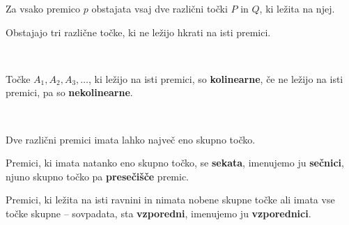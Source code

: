             \begin{aksiom}
                Za vsako premico $p$ obstajata vsaj dve različni točki $P$ in $Q$, ki ležita na njej.
            \end{aksiom}

            \begin{aksiom}
                Obstajajo tri različne točke, ki ne ležijo hkrati na isti premici.
            \end{aksiom}
        

            ~
        
            \begin{definicija}
                Točke $A_1, A_2, A_3, \dots$, ki ležijo na isti premici, so \textbf{kolinearne}, 
                če ne ležijo na isti premici, pa so \textbf{nekolinearne}.
            \end{definicija}

            ~

            \begin{izrek}
                Dve različni premici imata lahko največ eno skupno točko.
            \end{izrek}

            \begin{definicija}
                Premici, ki imata natanko eno skupno točko, se \textbf{sekata}, imenujemo ju \textbf{sečnici},
                njuno skupno točko pa \textbf{presečišče} premic.
            \end{definicija}

            \begin{definicija}
                Premici, ki ležita na isti ravnini in nimata nobene skupne točke ali imata vse točke skupne -- sovpadata, sta \textbf{vzporedni}, imenujemo ju \textbf{vzporednici}.
            \end{definicija}
        

            ~
        
